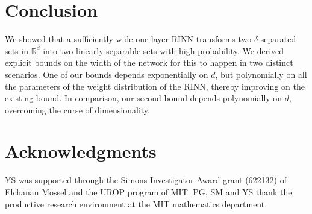 \documentclass[aoap]{imsart}
\numberwithin{equation}{section}
\theoremstyle{definition}
\theoremstyle{remark}
\numberwithin{equation}{section}
\newcommand{\0}{\mathbf{0}}
\newcommand{\1}{\mathbf{1}}
\numberwithin{equation}{section}
\begin{document}
\section{Conclusion}
We showed that a sufficiently wide one-layer RINN transforms two $\delta$-separated sets in $\mathbb{R}^d$ into two linearly separable sets with high probability. We derived explicit bounds on the width of the network for this to happen in two distinct scenarios. One of our bounds depends exponentially on $d$, but polynomially on all the parameters of the weight distribution of the RINN, thereby improving on the existing bound. In comparison, our second bound depends polynomially on $d$, overcoming the curse of dimensionality. %







\section*{Acknowledgments}
YS was supported through the Simons Investigator Award grant (622132) of Elchanan Mossel and the UROP program of MIT. PG, SM and YS thank the productive research environment at the MIT mathematics department.
 

\end{document}
